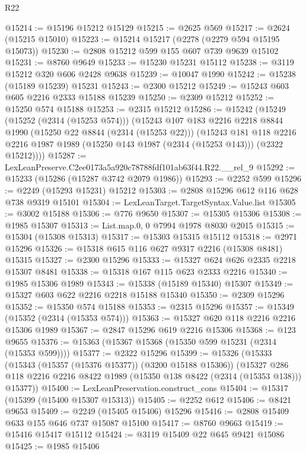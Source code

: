 \begin{lexlean}{R22}
\begin{coremodule}
@15214 := @15196 @15212 @15129
@15215 := @2625 @569
@15217 := @2624 (@15215 @15010)
@15223 := @15214 @15217 (@2278 (@2279 @594 @15195 @15073))
@15230 := @2808 @15212 @599 @155 @607 @739 @9639 @15102
@15231 := @8760 @9649
@15233 := @15230 @15231 @15112
@15238 := @3119 @15212 @320 @606 @2428 @9638
@15239 := @10047 @1990
@15242 := @15238 (@15189 @15239) @15231
@15243 := @2300 @15212
@15249 := @15243 @603 @605 @2216 @2333 @15188 @15239
@15250 := @2309 @15212
@15252 := @15250 @574 @15188
@15253 := @2315 @15212
@15286 := @15242
    (@15249
      (@15252 (@2314 (@15253 @574)))
      (@15243
        @107
        @183
        @2216
        @2218
        @8844
        @1990
        (@15250 @22 @8844 (@2314 (@15253 @22)))
        (@15243
          @181
          @118
          @2216
          @2216
          @1987
          @1989
          (@15250 @143 @1987 (@2314 (@15253 @143)))
          (@2322 @15212))))
@15287 := LexLeanPreserve.C2ee0173a5a920c78788fdf101ab63f44.R22.__rel_9
@15292 := @15233 (@15286 (@15287 @3742 @2079 @1986))
@15293 := @2252 @599
@15296 := @2249 (@15293 @15231) @15212
@15303 := @2808 @15296 @612 @116 @628 @738 @9319 @15101
@15304 := LexLeanTarget.TargetSyntax.Value.list
@15305 := @3002 @15188
@15306 := @776 @9650
@15307 := @15305 @15306
@15308 := @1985 @15307
@15313 := List.map.{0, 0} @7994 @1978 @8030 @2015
@15315 := @15304 (@15308 @15313)
@15317 := @15303 @15315 @15112
@15318 := @2971 @15296
@15326 := @15318 @615 @116 @627 @9317 @2216 (@15308 @8481) @15315
@15327 := @2300 @15296
@15333 := @15327 @624 @626 @2335 @2218 @15307 @8481
@15338 := @15318 @167 @115 @623 @2333 @2216
@15340 := @1985 @15306 @1989
@15343 := @15338 (@15189 @15340) @15307
@15349 := @15327 @603 @622 @2216 @2218 @15188 @15340
@15350 := @2309 @15296
@15352 := @15350 @574 @15188
@15353 := @2315 @15296
@15357 := @15349 (@15352 (@2314 (@15353 @574)))
@15363 := @15327 @620 @118 @2216 @2216 @15306 @1989
@15367 := @2847 @15296 @619 @2216 @15306
@15368 := @123 @9655
@15376 := @15363 (@15367 @15368 (@15350 @599 @15231 (@2314 (@15353 @599))))
@15377 := @2322 @15296
@15399 := @15326
    (@15333
      (@15343 (@15357 (@15376 @15377)) (@3200 @15188 @15306))
      (@15327 @286 @118 @2216 @2216 @8422 @1989 (@15350 @138 @8422 (@2314 (@15353 @138))) @15377))
@15400 := LexLeanPreservation.construct_cons
@15404 := @15317 (@15399 (@15400 @15307 @15313))
@15405 := @2252 @612
@15406 := @8421 @9653
@15409 := @2249 (@15405 @15406) @15296
@15416 := @2808 @15409 @633 @155 @646 @737 @15087 @15100
@15417 := @8760 @9663
@15419 := @15416 @15417 @15112
@15424 := @3119 @15409 @22 @645 @9421 @15086
@15425 := @1985 @15406

\end{coremodule}
\end{lexlean}
